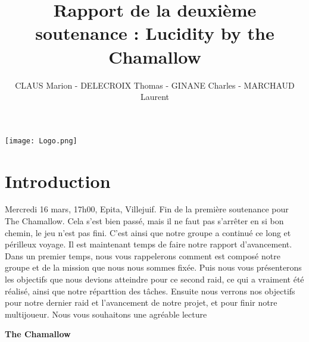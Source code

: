 \documentclass{article}
\begin{document}
\large
\begin{titlepage}
		\title{Rapport de la deuxième  soutenance : Lucidity by the Chamallow}
		
		\author{CLAUS Marion -  DELECROIX Thomas - GINANE Charles - MARCHAUD Laurent} 

		
\end{titlepage}
\pagestyle{fancy}
\renewcommand{\footrulewidth}{0.4pt}

 \begin{titlepage}
\centering
\maketitle
\texttt{[image: Logo.png]}

  \end{titlepage}


\tableofcontents

\newpage

\section{Introduction}

\quad

\quad

    Mercredi 16 mars, 17h00, Epita, Villejuif. Fin de la première soutenance pour The Chamallow. Cela s’est bien passé, mais il ne faut pas s’arrêter en si bon chemin, le jeu n’est pas fini. C’est ainsi que notre groupe a continué ce long et périlleux voyage. Il est maintenant temps de faire notre rapport d’avancement. Dans un premier temps, nous vous rappelerons comment est composé notre groupe et de la mission que nous nous sommes fixée. Puis nous vous présenterons les objectifs que nous devions atteindre pour ce second raid, ce qui a vraiment été réalisé, ainsi que notre réparttion des tâches. Ensuite nous verrons nos objectifs pour notre dernier raid et l’avancement de notre projet, et pour finir notre multijoueur.
Nous vous souhaitons une agréable lecture 


\quad

\quad


\begin{centering}


\textbf {The Chamallow}

\end{centering}

\quad
\end{document}
